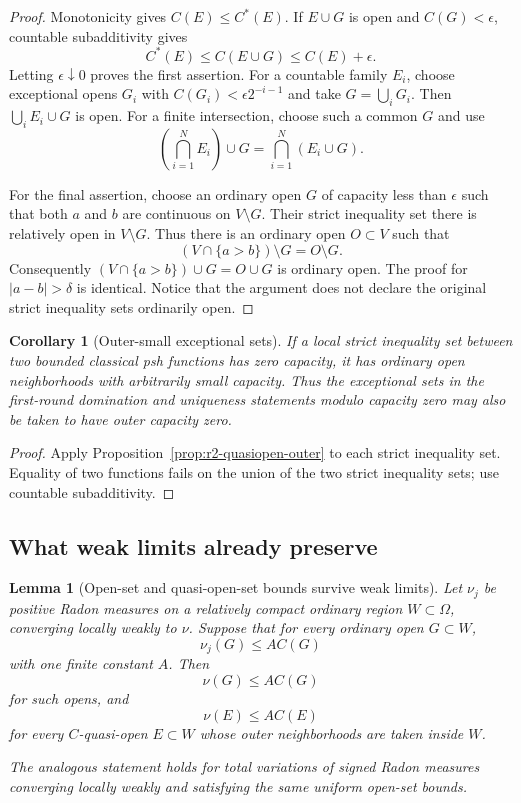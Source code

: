 \documentclass[11pt,a4paper]{article}
\numberwithin{equation}{section}
\newtheorem{lemma}[theorem]{Lemma}
\newtheorem{corollary}[theorem]{Corollary}
\theoremstyle{definition}
\theoremstyle{remark}
\begin{document}
\begin{proof}
Monotonicity gives $C(E)\leq C^*(E)$. If $E\cup G$ is open and
$C(G)<\epsilon$, countable subadditivity gives
\[
 C^*(E)\leq C(E\cup G)\leq C(E)+\epsilon.
\]
Letting $\epsilon\downarrow0$ proves the first assertion. For a
countable family $E_i$, choose exceptional opens $G_i$ with
$C(G_i)<\epsilon2^{-i-1}$ and take $G=\bigcup_iG_i$. Then
$\bigcup_iE_i\cup G$ is open. For a finite intersection, choose
such a common $G$ and use
\[
 \left(\bigcap_{i=1}^N E_i\right)\cup G
     =\bigcap_{i=1}^N(E_i\cup G).
\]

For the final assertion, choose an ordinary open $G$ of capacity
less than $\epsilon$ such that both $a$ and $b$ are continuous on
$V\setminus G$. Their strict inequality set there is relatively
open in $V\setminus G$. Thus there is an ordinary open $O\subset V$
such that
\[
 (V\cap\{a>b\})\setminus G=O\setminus G.
\]
Consequently $(V\cap\{a>b\})\cup G=O\cup G$ is ordinary open.
The proof for $|a-b|>\delta$ is identical. Notice that the argument
does not declare the original strict inequality sets ordinarily open.
\end{proof}

\begin{corollary}[Outer-small exceptional sets]
\label{cor:r2-outer-zero}
If a local strict inequality set between two bounded classical psh
functions has zero capacity, it has ordinary open neighborhoods
with arbitrarily small capacity. Thus the exceptional sets in the
first-round domination and uniqueness statements modulo capacity
zero may also be taken to have outer capacity zero.
\end{corollary}

\begin{proof}
Apply Proposition~\ref{prop:r2-quasiopen-outer} to each strict
inequality set. Equality of two functions fails on the union of
the two strict inequality sets; use countable subadditivity.
\end{proof}

\subsection{What weak limits already preserve}

\begin{lemma}[Open-set and quasi-open-set bounds survive weak limits]
\label{lem:r2-open-limit}
Let $\nu_j$ be positive Radon measures on a relatively compact
ordinary region $W\subset\Omega$, converging locally weakly to
$\nu$. Suppose that for every ordinary open $G\subset W$,
\[
 \nu_j(G)\leq A C(G)
\]
with one finite constant $A$. Then
\[
 \nu(G)\leq A C(G)
\]
for such opens, and
\[
 \nu(E)\leq A C(E)
\]
for every $C$-quasi-open $E\subset W$ whose outer neighborhoods
are taken inside $W$.

The analogous statement holds for total variations of signed
Radon measures converging locally weakly and satisfying the same
uniform open-set bounds.
\end{lemma}
\end{document}
